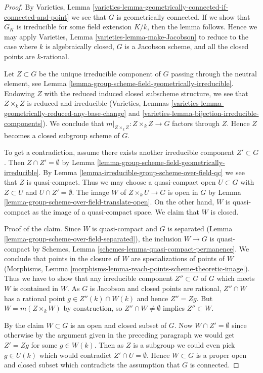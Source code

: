 \begin{proof}
By Varieties, Lemma
\ref{varieties-lemma-geometrically-connected-if-connected-and-point}
we see that $G$ is geometrically connected. If we show that $G_K$
is irreducible for some field extension $K/k$, then
the lemma follows. Hence we may apply
Varieties, Lemma \ref{varieties-lemma-make-Jacobson}
to reduce to the case where $k$ is algebraically closed,
$G$ is a Jacobson scheme, and all the closed points are $k$-rational.

\medskip\noindent
Let $Z \subset G$ be the unique irreducible component of $G$ passing
through the neutral element, see
Lemma \ref{lemma-group-scheme-field-geometrically-irreducible}.
Endowing $Z$ with the reduced induced closed subscheme structure,
we see that $Z \times_k Z$ is reduced and irreducible
(Varieties, Lemmas
\ref{varieties-lemma-geometrically-reduced-any-base-change} and
\ref{varieties-lemma-bijection-irreducible-components}).
We conclude that $m|_{Z \times_k Z} : Z \times_k Z \to G$ factors
through $Z$. Hence $Z$ becomes a closed subgroup scheme of $G$.

\medskip\noindent
To get a contradiction, assume there exists another irreducible
component $Z' \subset G$. Then $Z \cap Z' = \emptyset$ by
Lemma \ref{lemma-group-scheme-field-geometrically-irreducible}.
By Lemma \ref{lemma-irreducible-group-scheme-over-field-qc}
we see that $Z$ is quasi-compact. Thus we may choose a quasi-compact open
$U \subset G$ with $Z \subset U$ and $U \cap Z' = \emptyset$.
The image $W$ of $Z \times_k U \to G$ is open in $G$ by
Lemma \ref{lemma-group-scheme-over-field-translate-open}.
On the other hand, $W$ is quasi-compact as the image of a
quasi-compact space. We claim that $W$ is closed.

\medskip\noindent
Proof of the claim. Since $W$ is quasi-compact and $G$ is separated
(Lemma \ref{lemma-group-scheme-over-field-separated}), the inclusion
$W \to G$ is quasi-compact by Schemes, Lemma
\ref{schemes-lemma-quasi-compact-permanence}. We conclude that
points in the closure of $W$ are specializations of points of $W$
(Morphisms, Lemma \ref{morphisms-lemma-reach-points-scheme-theoretic-image}).
Thus we have to show that any irreducible
component $Z'' \subset G$ of $G$ which meets $W$ is contained in $W$.
As $G$ is Jacobson and closed points are rational,
$Z'' \cap W$ has a rational point
$g \in Z''(k) \cap W(k)$ and hence $Z'' = Zg$. But $W = m(Z \times_k W)$
by construction, so $Z'' \cap W \not = \emptyset$ implies
$Z'' \subset W$.

\medskip\noindent
By the claim $W \subset G$ is an open and closed subset of $G$.
Now $W \cap Z' = \emptyset$ since otherwise by the argument given in
the preceding paragraph we would get $Z' = Zg$ for some $g \in W(k)$.
Then as $Z$ is a subgroup we could even pick $g \in U(k)$ which would
contradict $Z' \cap U = \emptyset$. Hence $W \subset G$ is a proper open
and closed subset which contradicts the assumption that $G$ is connected.
\end{proof}

